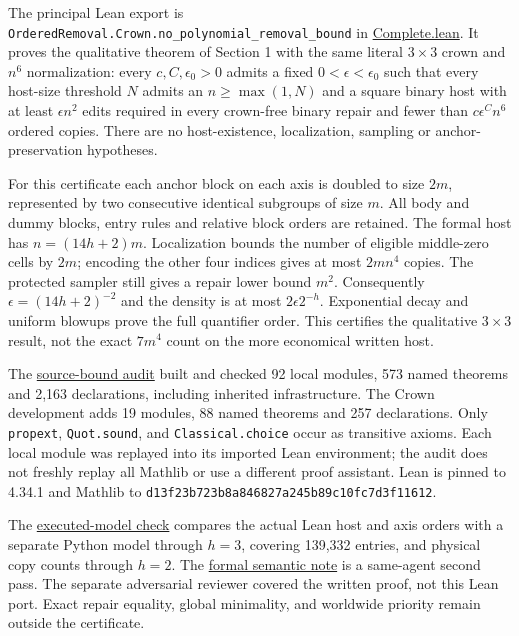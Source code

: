 \documentclass[11pt,letterpaper]{article}
\begin{document}
The principal Lean export is
\nolinkurl{OrderedRemoval.Crown.no_polynomial_removal_bound} in
\href{https://github.com/shea256/ordered-binary-matrix-removal/blob/master/formal/OrderedRemoval/Crown/Complete.lean}{Complete.lean}.
It proves the qualitative theorem of Section 1 with the same literal
\(3\times 3\) crown and \(n^{6}\) normalization: every
\(c,C,\epsilon _{0}>0\) admits a fixed \(0<\epsilon <\epsilon _{0}\)
such that every host-size threshold \(N\) admits an \(n\ge \max(1,N)\)
and a square binary host with at least \(\epsilon n^{2}\) edits required
in every crown-free binary repair and fewer than \(c \epsilon ^C n^{6}\)
ordered copies. There are no host-existence, localization, sampling or
anchor-preservation hypotheses.

For this certificate each anchor block on each axis is doubled to size
\(2m\), represented by two consecutive identical subgroups of size
\(m\). All body and dummy blocks, entry rules and relative block orders
are retained. The formal host has \(n=(14h+2)m\). Localization bounds
the number of eligible middle-zero cells by \(2m\); encoding the other
four indices gives at most \(2mn^{4}\) copies. The protected sampler
still gives a repair lower bound \(m^{2}\). Consequently
\(\epsilon =(14h+2)^{-2}\) and the density is at most
\(2\epsilon 2^{-h}\). Exponential decay and uniform blowups prove the
full quantifier order. This certifies the qualitative \(3\times 3\)
result, not the exact \(7m^{4}\) count on the more economical written
host.

The
\href{https://github.com/shea256/ordered-binary-matrix-removal/blob/master/verification/reference/crown-formal-audit.json}{source-bound
audit} built and checked 92 local modules, 573 named theorems and 2,163
declarations, including inherited infrastructure. The Crown development
adds 19 modules, 88 named theorems and 257 declarations. Only
\nolinkurl{propext}, \nolinkurl{Quot.sound}, and
\nolinkurl{Classical.choice} occur as transitive axioms. Each local
module was replayed into its imported Lean environment; the audit does
not freshly replay all Mathlib or use a different proof assistant. Lean
is pinned to 4.34.1 and Mathlib to
\nolinkurl{d13f23b723b8a846827a245b89c10fc7d3f11612}.

The
\href{https://github.com/shea256/ordered-binary-matrix-removal/blob/master/verification/reference/crown-formal-model-report.json}{executed-model
check} compares the actual Lean host and axis orders with a separate
Python model through \(h=3\), covering 139,332 entries, and physical
copy counts through \(h=2\). The
\href{https://github.com/shea256/ordered-binary-matrix-removal/blob/master/verification/reviews/three-by-three-formal-scope.md}{formal
semantic note} is a same-agent second pass. The separate adversarial
reviewer covered the written proof, not this Lean port. Exact repair
equality, global minimality, and worldwide priority remain outside the
certificate.
\end{document}

